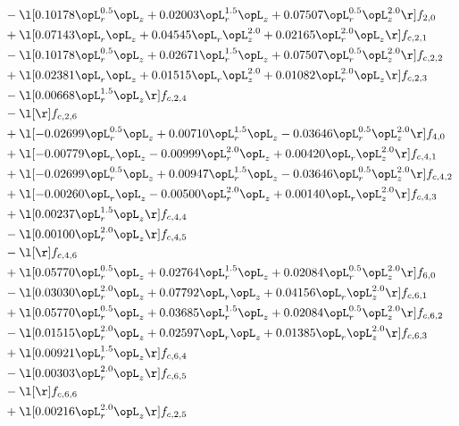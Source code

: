 \begin{alignat}{2}
& - \l[  0.10178 \opL_r^{0.5} \opL_z +  0.02003 \opL_r^{1.5} \opL_z +  0.07507 \opL_r^{0.5} \opL_z^{2.0}  \r] f_{2,0} \nonumber \\ 
& + \l[  0.07143 \opL_r \opL_z +  0.04545 \opL_r \opL_z^{2.0} +  0.02165 \opL_r^{2.0} \opL_z  \r] f_{c,2,1} \nonumber \\ 
& - \l[  0.10178 \opL_r^{0.5} \opL_z +  0.02671 \opL_r^{1.5} \opL_z +  0.07507 \opL_r^{0.5} \opL_z^{2.0}  \r] f_{c,2,2} \nonumber \\ 
& + \l[  0.02381 \opL_r \opL_z +  0.01515 \opL_r \opL_z^{2.0} +  0.01082 \opL_r^{2.0} \opL_z  \r] f_{c,2,3} \nonumber \\ 
& - \l[  0.00668 \opL_r^{1.5} \opL_z  \r] f_{c,2,4} \nonumber \\ 
& - \l[  \r] f_{c,2,6} \nonumber \\ 
& + \l[  -0.02699 \opL_r^{0.5} \opL_z +  0.00710 \opL_r^{1.5} \opL_z   -0.03646 \opL_r^{0.5} \opL_z^{2.0}  \r] f_{4,0} \nonumber \\ 
& + \l[  -0.00779 \opL_r \opL_z   -0.00999 \opL_r^{2.0} \opL_z +  0.00420 \opL_r \opL_z^{2.0}  \r] f_{c,4,1} \nonumber \\ 
& + \l[  -0.02699 \opL_r^{0.5} \opL_z +  0.00947 \opL_r^{1.5} \opL_z   -0.03646 \opL_r^{0.5} \opL_z^{2.0}  \r] f_{c,4,2} \nonumber \\ 
& + \l[  -0.00260 \opL_r \opL_z   -0.00500 \opL_r^{2.0} \opL_z +  0.00140 \opL_r \opL_z^{2.0}  \r] f_{c,4,3} \nonumber \\ 
& + \l[  0.00237 \opL_r^{1.5} \opL_z  \r] f_{c,4,4} \nonumber \\ 
& - \l[  0.00100 \opL_r^{2.0} \opL_z  \r] f_{c,4,5} \nonumber \\ 
& - \l[  \r] f_{c,4,6} \nonumber \\ 
& + \l[  0.05770 \opL_r^{0.5} \opL_z +  0.02764 \opL_r^{1.5} \opL_z +  0.02084 \opL_r^{0.5} \opL_z^{2.0}  \r] f_{6,0} \nonumber \\ 
& - \l[  0.03030 \opL_r^{2.0} \opL_z +  0.07792 \opL_r \opL_z +  0.04156 \opL_r \opL_z^{2.0}  \r] f_{c,6,1} \nonumber \\ 
& + \l[  0.05770 \opL_r^{0.5} \opL_z +  0.03685 \opL_r^{1.5} \opL_z +  0.02084 \opL_r^{0.5} \opL_z^{2.0}  \r] f_{c,6,2} \nonumber \\ 
& - \l[  0.01515 \opL_r^{2.0} \opL_z +  0.02597 \opL_r \opL_z +  0.01385 \opL_r \opL_z^{2.0}  \r] f_{c,6,3} \nonumber \\ 
& + \l[  0.00921 \opL_r^{1.5} \opL_z  \r] f_{c,6,4} \nonumber \\ 
& - \l[  0.00303 \opL_r^{2.0} \opL_z  \r] f_{c,6,5} \nonumber \\ 
& - \l[  \r] f_{c,6,6} \nonumber \\ 
& + \l[  0.00216 \opL_r^{2.0} \opL_z  \r] f_{c,2,5} \nonumber \\ 
\end{alignat} 


